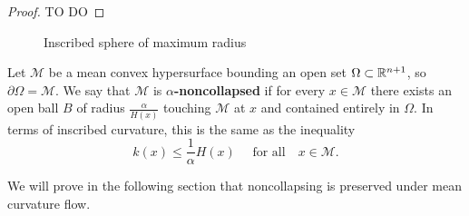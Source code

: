 \begin{comment}
    The inscribed curvature is greater than the largest principal curvature, which can be proved in the following fashion. 
\newpage
\begin{lemma}
    Let $ \mathcal{M} $ be an embedded hypersurface in $ \Rn $ and the inscribed curvature be defined as above. Then for any point $ x \in \mathcal{M} $,
    \[ k(x) \ge \kappa_{n}(x) \]
    where $ \kappa_{1}(x) \le \ldots \le \kappa_{n}(x) $ are the principal curvatures of the hypersurface at the point $ x  $.
\end{lemma}
\end{comment}
\begin{proof}
    TO DO
\end{proof}
\begin{figure}[h]
    \centering
    \caption{Inscribed sphere of maximum radius}
\end{figure}

\begin{defn}
    Let $ \mathcal{M} $ be a mean convex hypersurface bounding an open set $ \Omega \subset \mathbb{R}^{n+1}$, so $ \partial \Omega = \mathcal{M} $. We say that $ \mathcal{M} $ is \textbf{$ \alpha $-noncollapsed}  if for every $ x \in \mathcal{M} $ there exists an open ball $ B $ of radius $ \frac{\alpha}{H(x)} $ touching $ \mathcal{M} $ at $ x $ and contained entirely in $ \Omega $. In terms of inscribed curvature, this is the same as the inequality \begin{equation}
        k(x) \le \frac{1}{\alpha} H(x) \quad \text{ for all} \quad x \in \mathcal{M}.
    \end{equation}
\end{defn}
We will prove in the following section that noncollapsing is preserved under mean curvature flow.
